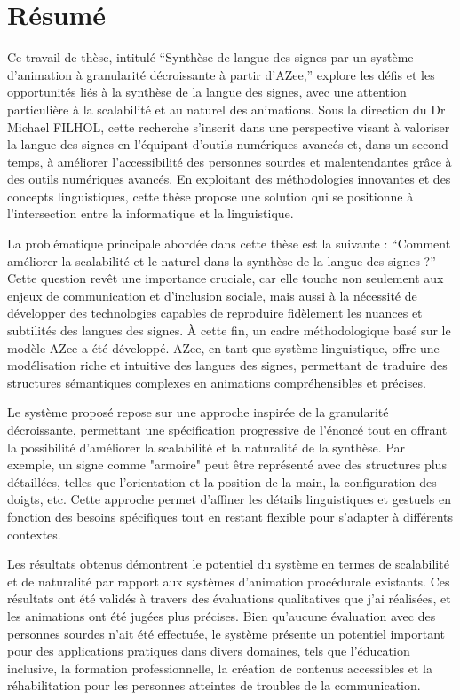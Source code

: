 \documentclass[a4paper,12pt]{report}
\begin{document}
\chapter*{Résumé}

Ce travail de thèse, intitulé “Synthèse de langue des signes par un système d'animation à granularité décroissante à partir d'AZee,” explore les défis et les opportunités liés à la synthèse de la langue des signes, avec une attention particulière à la scalabilité et au naturel des animations. Sous la direction du Dr Michael FILHOL, cette recherche s’inscrit dans une perspective visant à valoriser la langue des signes en l’équipant d’outils numériques avancés et, dans un second temps, à améliorer l’accessibilité des personnes sourdes et malentendantes grâce à des outils numériques avancés. En exploitant des méthodologies innovantes et des concepts linguistiques, cette thèse propose une solution qui se positionne à l’intersection entre la informatique et la linguistique.

La problématique principale abordée dans cette thèse est la suivante : “Comment améliorer la scalabilité et le naturel dans la synthèse de la langue des signes ?” Cette question revêt une importance cruciale, car elle touche non seulement aux enjeux de communication et d’inclusion sociale, mais aussi à la nécessité de développer des technologies capables de reproduire fidèlement les nuances et subtilités des langues des signes. À cette fin, un cadre méthodologique basé sur le modèle AZee a été développé. AZee, en tant que système linguistique, offre une modélisation riche et intuitive des langues des signes, permettant de traduire des structures sémantiques complexes en animations compréhensibles et précises.

Le système proposé repose sur une approche inspirée de la granularité décroissante, permettant une spécification progressive de l'énoncé tout en offrant la possibilité d'améliorer la scalabilité et la naturalité de la synthèse. Par exemple, un signe comme "armoire" peut être représenté avec des structures plus détaillées, telles que l'orientation et la position de la main, la configuration des doigts, etc. Cette approche permet d’affiner les détails linguistiques et gestuels en fonction des besoins spécifiques tout en restant flexible pour s’adapter à différents contextes.

Les résultats obtenus démontrent le potentiel du système en termes de scalabilité et de naturalité par rapport aux systèmes d'animation procédurale existants. Ces résultats ont été validés à travers des évaluations qualitatives que j'ai réalisées, et les animations ont été jugées plus précises. Bien qu’aucune évaluation avec des personnes sourdes n'ait été effectuée, le système présente un potentiel important pour des applications pratiques dans divers domaines, tels que l’éducation inclusive, la formation professionnelle, la création de contenus accessibles et la réhabilitation pour les personnes atteintes de troubles de la communication.
\end{document}
